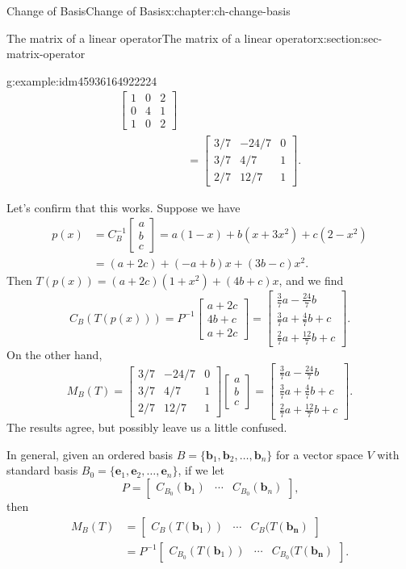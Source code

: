 \documentclass[oneside,10pt,]{book}
\numberwithin{equation}{section}
\newcommand{\bbm}{\begin{bmatrix}}
\newcommand{\ebm}{\end{bmatrix}}
\newcommand{\basis}[2]{\{\mathbf{#1}_1,\mathbf{#1}_2,\ldots,\mathbf{#1}_{#2}\}}
\newcommand{\amp}{&}
\begin{document}
\begin{chapterptx}{Change of Basis}{}{Change of Basis}{}{}{x:chapter:ch-change-basis}
\begin{sectionptx}{The matrix of a linear operator}{}{The matrix of a linear operator}{}{}{x:section:sec-matrix-operator}
\begin{example}{}{g:example:idm45936164922224}
\begin{align*}
\bbm 1\amp 0\amp 2\\0\amp 4\amp 1\\1\amp 0\amp 2\ebm\\
\amp = \bbm 3/7\amp -24/7\amp 0\\3/7\amp 4/7\amp 1\\2/7\amp 12/7\amp 1\ebm\text{.}
\end{align*}
%
\par
Let's confirm that this works. Suppose we have%
\begin{align*}
p(x) \amp = C_B^{-1}\bbm a\\b\\c\ebm = a(1-x)+b(x+3x^2)+c(2-x^2)\\
\amp = (a+2c)+(-a+b)x+(3b-c)x^2\text{.}
\end{align*}
Then \(T(p(x))=(a+2c)(1+x^2)+(4b+c)x\), and we find%
\begin{equation*}
C_B(T(p(x))) = P^{-1}\bbm a+2c\\4b+c\\a+2c\ebm = \bbm \frac37 a-\frac{24}{7}b\\\frac37 a+\frac47 b+c\\\frac27 a+\frac{12}{7}b+c\ebm\text{.}
\end{equation*}
On the other hand,%
\begin{equation*}
M_B(T) = \bbm 3/7\amp -24/7\amp 0\\3/7\amp 4/7\amp 1\\2/7\amp 12/7\amp 1\ebm\bbm a\\b\\c\ebm = \bbm \frac37 a-\frac{24}{7}b\\\frac37 a+\frac47 b+c\\\frac27 a+\frac{12}{7}b+c\ebm\text{.}
\end{equation*}
The results agree, but possibly leave us a little confused.%
\end{example}
In general, given an ordered basis \(B=\basis{b}{n}\) for a vector space \(V\) with standard basis \(B_0 = \basis{e}{n}\), if we let%
\begin{equation*}
P = \bbm C_{B_0}(\mathbf{b}_1) \amp \cdots \amp C_{B_0}(\mathbf{b}_n)\ebm\text{,}
\end{equation*}
then%
\begin{align*}
M_B(T) \amp = \bbm C_B(T(\mathbf{b}_1)) \amp \cdots \amp C_B(T(\mathbf{b_n})\ebm\\
\amp = P^{-1}\bbm C_{B_0}(T(\mathbf{b}_1)) \amp \cdots \amp C_{B_0}(T(\mathbf{b_n})\ebm\text{.}
\end{align*}

\end{sectionptx}
\end{chapterptx}
\end{document}
